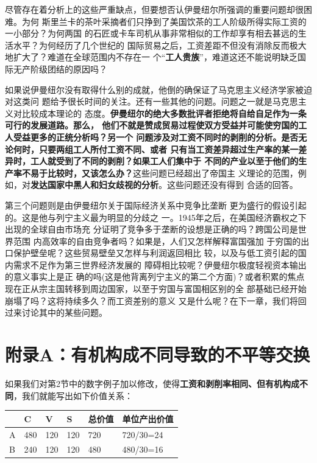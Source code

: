 尽管存在着分析上的这些严重缺点，但要想否认伊曼纽尔所强调的重要问题却很困难。为何
斯里兰卡的茶叶采摘者们只挣到了美国饮茶的工人阶级所得实际工资的一小部分？为何两国
的石匠或卡车司机从事非常相似的工作却享有相去甚远的生活水平？为何经历了几个世纪的
国际贸易之后，工资差距不但没有消除反而极大地扩大了？难道在全球范围内不存在一
个“\textbf{工人贵族}”，难道这还不能说明缺乏国际无产阶级团结的原因吗？

如果说伊曼纽尔没有取得什么别的成就，他倒的确保证了马克思主义经济学家被迫对这类问
题给予很长时间的关注。还有一些其他的问题。问题之一就是马克思主义对比较成本理论的
态度。\textbf{伊曼纽尔的绝大多数批评者拒绝将自给自足作为一条可行的发展道路。那么，
  他们不就是赞成贸易过程使双方受益并可能使穷国的工人受益更多的正统分析吗？另一个
  问题涉及对工资不同时的剥削的分析。是否无论何时，只要两组工人所付工资不同、或者
  只有当工资差异超过生产率的某一差异时，工人就受到了不同的剥削？如果工人们集中于
  不同的产业以至于他们的生产率不易于比较时，又该怎么办？}这些问题已经超出了帝国主
义理论的范围，例如，对\textbf{发达国家中黑人和妇女歧视的分析}。这些问题还没有得到
合适的回答。

第三个问题则是由伊曼纽尔关于国际经济关系中竞争比垄断
更为盛行的假设引起的。这是他与列宁主义最为明显的分歧之
一。1945年之后，在美国经济霸权之下出现的全球自由市场充
分证明了竞争多于垄断的设想是正确的吗？跨国公司是世界范围
内高效率的自由竞争者吗？如果是，人们又怎样解释富国强加
于穷国的出口保护壁垒呢？这些贸易壁垒又怎样与利润返回相比
较，以及与低工资引起的国内需求不足作为第三世界经济发展的
障碍相比较呢？伊曼纽尔极度轻视资本输出的意义事实上是正
确的吗(这是他背离列宁主义的第二个方面)？或者积累的焦点
现在正从宗主国转移到周边国家，以至于穷国与富国相区别的全
部基础已经开始崩塌了吗？这将持续多久？而工资差别的意义
又是什么呢？在下一章，我们将回过来讨论其中的某些问题。


\section{附录A：有机构成不同导致的不平等交换}
如果我们对第2节中的数字例子加以修改，使得\textbf{工资和剥削率相同、但有机构成不
  同}，我们就能写出如下价值关系：

\begin{table}[H]
\centering
\begin{tabular}{@{}llllll@{}}
\toprule
  & C   & V   & S   & 总价值 & 单位产出价值    \\ \midrule
A & 480 & 120 & 120 & 720 & 720/30=24 \\
B & 240 & 120 & 120 & 480 & 480/30=16 \\ \bottomrule
\end{tabular}
\end{table}

